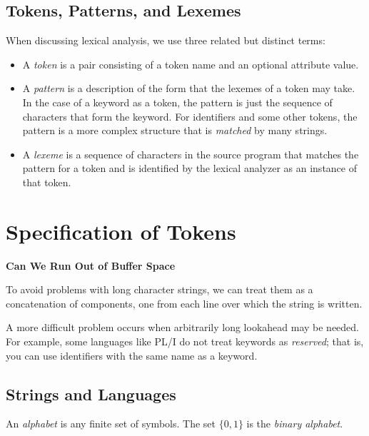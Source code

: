 \documentclass[a4paper,twoside]{book}
\begin{document}
\subsection{Tokens, Patterns, and Lexemes}

When discussing lexical analysis, we use three related but distinct terms:
\begin{itemize}
    \item A \textit{token} is a pair consisting of a token name and an optional attribute value.
    \item A \textit{pattern} is a description of the form that the lexemes of a token may take. In the case of a keyword as a token, the pattern is just the sequence of characters that form the keyword. For identifiers and some other tokens, the pattern is a more complex structure that is \textit{matched} by many strings.
    \item A \textit{lexeme}  is a sequence of characters in the source program that matches the pattern for a token and is identified by the lexical analyzer as an instance of that token.
\end{itemize}

\section{Specification of Tokens}

\begin{framed}
    \begin{center}
        \textbf{{\large Can We Run Out of Buffer Space}}
    \end{center}

    To avoid problems with long character strings, we can treat them as a concatenation of components, one from each line over which the string is written.

    A more difficult problem occurs when arbitrarily long lookahead may be needed. For example, some languages like PL/I do not treat keywords as \textit{reserved}; that is, you can use identifiers with the same name as a keyword.
\end{framed}

\subsection{Strings and Languages}

An \textit{alphabet} is any finite set of symbols. The set $\{0,1\}$ is the \textit{binary alphabet}.
\end{document}
